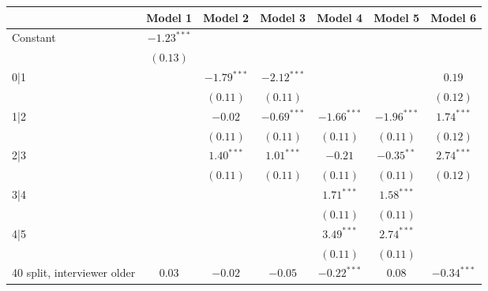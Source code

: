 
\usepackage{booktabs}
\usepackage{threeparttable}

\begin{table}
\begin{center}
\begin{threeparttable}
\begin{tabular}{l c c c c c c}
\toprule
 & Model 1 & Model 2 & Model 3 & Model 4 & Model 5 & Model 6 \\
\midrule
Constant                        & $-1.23^{***}$ &               &               &               &               &               \\
                                & $(0.13)$      &               &               &               &               &               \\
0|1                             &               & $-1.79^{***}$ & $-2.12^{***}$ &               &               & $0.19$        \\
                                &               & $(0.11)$      & $(0.11)$      &               &               & $(0.12)$      \\
1|2                             &               & $-0.02$       & $-0.69^{***}$ & $-1.66^{***}$ & $-1.96^{***}$ & $1.74^{***}$  \\
                                &               & $(0.11)$      & $(0.11)$      & $(0.11)$      & $(0.11)$      & $(0.12)$      \\
2|3                             &               & $1.40^{***}$  & $1.01^{***}$  & $-0.21$       & $-0.35^{**}$  & $2.74^{***}$  \\
                                &               & $(0.11)$      & $(0.11)$      & $(0.11)$      & $(0.11)$      & $(0.12)$      \\
3|4                             &               &               &               & $1.71^{***}$  & $1.58^{***}$  &               \\
                                &               &               &               & $(0.11)$      & $(0.11)$      &               \\
4|5                             &               &               &               & $3.49^{***}$  & $2.74^{***}$  &               \\
                                &               &               &               & $(0.11)$      & $(0.11)$      &               \\
40 split, interviewer older     & $0.03$        & $-0.02$       & $-0.05$       & $-0.22^{***}$ & $0.08$        & $-0.34^{***}$ \\

\end{tabular}
\end{threeparttable}
\end{center}
\end{table}

